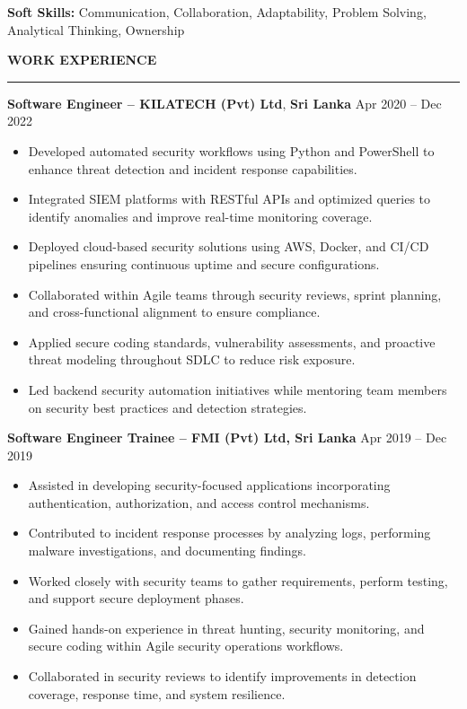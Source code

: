 \documentclass[10pt,letterpaper]{article}
\begin{document}
\textbf{Soft Skills:} Communication, Collaboration, Adaptability, Problem Solving, Analytical Thinking, Ownership

\vspace{8pt}

\textbf{WORK EXPERIENCE}\\[-8pt]
\noindent\rule{\textwidth}{1pt}

\vspace{-2pt}

\textbf{Software Engineer -- KILATECH (Pvt) Ltd}, \textbf{Sri Lanka} \hfill Apr 2020 -- Dec 2022

\vspace{-1pt}

\begin{itemize}
\item Developed automated security workflows using Python and PowerShell to enhance threat detection and incident response capabilities.
\item Integrated SIEM platforms with RESTful APIs and optimized queries to identify anomalies and improve real-time monitoring coverage.
\item Deployed cloud-based security solutions using AWS, Docker, and CI/CD pipelines ensuring continuous uptime and secure configurations.
\item Collaborated within Agile teams through security reviews, sprint planning, and cross-functional alignment to ensure compliance.
\item Applied secure coding standards, vulnerability assessments, and proactive threat modeling throughout SDLC to reduce risk exposure.
\item Led backend security automation initiatives while mentoring team members on security best practices and detection strategies.
\end{itemize}

\textbf{Software Engineer Trainee -- FMI (Pvt) Ltd, Sri Lanka} \hfill Apr 2019 -- Dec 2019

\vspace{-1pt}

\begin{itemize}
\item Assisted in developing security-focused applications incorporating authentication, authorization, and access control mechanisms.
\item Contributed to incident response processes by analyzing logs, performing malware investigations, and documenting findings.
\item Worked closely with security teams to gather requirements, perform testing, and support secure deployment phases.
\item Gained hands-on experience in threat hunting, security monitoring, and secure coding within Agile security operations workflows.
\item Collaborated in security reviews to identify improvements in detection coverage, response time, and system resilience.
\end{itemize}
\end{document}
